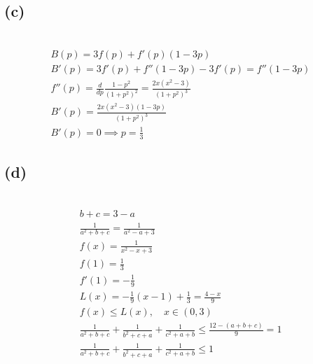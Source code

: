 \documentclass[12pt]{article}
\newcommand{\subproblem}[1]{\subsection{(#1)} \,}
\begin{document}
\subproblem{c}
\begin{gather*}
    B(p)=3f(p)+f'(p)(1-3p)\\
    B'(p)=3f'(p)+f''(1-3p)-3f'(p)=f''(1-3p)\\
    f''(p)= \frac{d}{dp}  \frac{1-p^2}{(1+p^2)^2} = \frac{2x(x^2-3)} {(1+p^2)^3}\\
    B'(p)=\frac{2x(x^2-3)(1-3p)} {(1+p^2)^3}\\
    B'(p)=0 \implies \boxed{p=\frac{1}{3}}
\end{gather*}

\subproblem{d}
\begin{gather*}
    b+c=3-a\\
    \frac{1}{a^2+b+c}= \frac{1}{a^2-a+3}\\
    f(x)=\frac{1}{x^2-x+3}\\
    f(1)=\frac{1}{3}\\
    f'(1)= -\frac{1}{9}\\
    L(x)= -\frac{1}{9}(x-1)+\frac{1}{3}=\frac{4-x}{9}\\
    f(x)\le L(x), \quad x \in (0,3)\\
    \frac{1}{a^2+b+c} + \frac{1}{b^2+c+a} + \frac{1}{c^2+a+b} \le  \frac{12 - (a + b + c)}{9} = 1\\
    \boxed{\frac{1}{a^2+b+c} + \frac{1}{b^2+c+a} + \frac{1}{c^2+a+b} \le 1}
\end{gather*}
\end{document}
